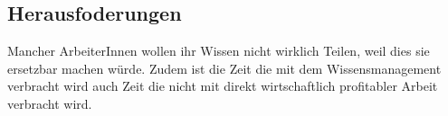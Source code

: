 \documentclass{article}
\begin{document}
\subsection{Herausfoderungen}
Mancher ArbeiterInnen wollen ihr Wissen nicht wirklich Teilen, weil dies sie ersetzbar machen würde. Zudem ist die Zeit die mit dem Wissensmanagement verbracht wird auch Zeit die nicht mit direkt wirtschaftlich profitabler Arbeit verbracht wird.
\end{document}
